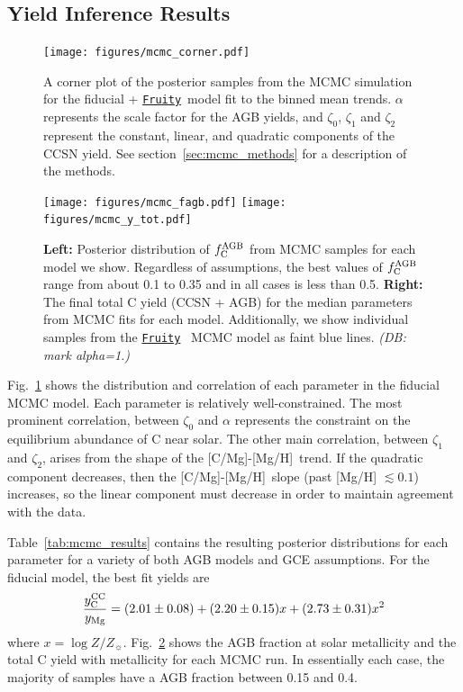 \documentclass[fleqn,
usenatbib]{mnras}
\newcommand{\fruity}{\texttt{\hyperlink{fruity}{Fruity}}}
\newcommand{\caah}{[C/Mg]-[Mg/H]}
\newcommand{\Ycc}{{y_{\rm C}^{\rm CC}}}
\newcommand{\fagb}{f_{\rm C}^{\rm AGB}}
\newcommand{\zetao}{\zeta_0}
\newcommand{\zetai}{\zeta_{1}}
\newcommand{\zetaii}{\zeta_{2}}
\newcommand{\Zo}{ Z_{\sun}}
\newcommand{\dbnote}[1]{ {\color{Thistle} \textit{\small (DB: #1)}} }
\begin{document}
\subsection{Yield Inference Results} \label{sec:mcmc_results}


\begin{figure}
\centering
\texttt{[image: figures/mcmc\_corner.pdf]}
\caption[]{
A corner plot of the posterior samples from the MCMC simulation for the fiducial + \fruity\ model fit to the binned mean trends.
$\alpha$ represents the scale factor for the AGB yields, and $\zetao$, $\zetai$ and $\zetaii$ represent the constant, linear, and quadratic components of the CCSN yield.
See section~\ref{sec:mcmc_methods} for a description of the methods.
}

\label{fig:mcmc}
\end{figure}


\begin{figure}
    \centering
    \texttt{[image: figures/mcmc\_fagb.pdf]}
    \texttt{[image: figures/mcmc\_y\_tot.pdf]}
    
    \caption[]{
    \textbf{Left:} Posterior distribution of $\fagb$ from MCMC samples for each model we show. Regardless of assumptions, the best values of $\fagb$ range from about 0.1 to 0.35 and in all cases is less than 0.5.
    \textbf{Right:} The final total C yield (CCSN + AGB) for the median parameters from MCMC fits for each model. Additionally, we show individual samples from the \fruity{} \ MCMC model as faint blue lines.
    \dbnote{mark alpha=1.}
    }
    
    \label{fig:mcmc_ytot}
\end{figure}



Fig.~\ref{fig:mcmc} shows the distribution and correlation of each parameter in the fiducial MCMC model. Each parameter is relatively well-constrained. The most prominent correlation, between $\zetao$ and $\alpha$ represents the constraint on the equilibrium abundance of C near solar. The other main correlation, between $\zetai$ and $\zetaii$, arises from the shape of the \caah\ trend. If the quadratic component decreases, then the \caah\  slope (past [Mg/H] $\lesssim 0.1$) increases, so the linear component must decrease in order to maintain agreement with the data.

Table~\ref{tab:mcmc_results} contains the resulting posterior distributions for each parameter for a variety of both AGB models and GCE assumptions. 
For the fiducial model, the best fit yields are 
\begin{equation}
    \frac{\Ycc}{y_{\rm Mg}} = (2.01\pm  0.08) + (2.20 \pm 0.15) x + (2.73 \pm 0.31) x^2
\end{equation}
where $x = \log Z/\Zo$.
Fig.~\ref{fig:mcmc_ytot} shows the AGB fraction at solar metallicity and the total C yield with metallicity for each MCMC run. 
In essentially each case, the majority of samples have a AGB fraction between 0.15 and 0.4. 
\end{document}
